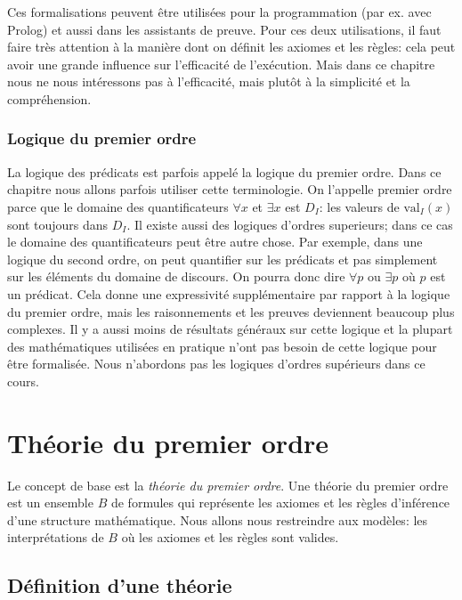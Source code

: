 {Ces formalisations peuvent être utilisées pour la programmation (par ex. avec Prolog)
et aussi dans les assistants de preuve.
Pour ces deux utilisations, il faut faire très attention à la manière dont on définit
les axiomes et les règles: cela peut avoir une grande influence sur l'efficacité de
l'exécution.
Mais dans ce chapitre nous ne nous intéressons pas à l'efficacité, mais plutôt à
la simplicité et la compréhension.

\subsubsection{Logique du premier ordre}

La logique des prédicats est parfois appelé la logique du premier ordre.
Dans ce chapitre nous allons parfois utiliser cette terminologie.
On l'appelle premier ordre parce que le domaine des quantificateurs $\forall x$ et $\exists x$
est $D_I$: les valeurs de $\mathrm{val}_I(x)$ sont toujours dans $D_I$.
Il existe aussi des logiques d'ordres superieurs; dans ce cas le domaine des quantificateurs
peut être autre chose.
Par exemple, dans une logique du second ordre, on peut quantifier sur les prédicats et pas
simplement sur les éléments du domaine de discours.
On pourra donc dire $\forall p$ ou $\exists p$ où $p$ est un prédicat.
Cela donne une expressivité supplémentaire par rapport à la logique du premier ordre,
mais les raisonnements et les preuves deviennent beaucoup plus complexes.
Il y a aussi moins de résultats généraux sur cette logique
et la plupart des mathématiques utilisées en pratique n'ont pas besoin de cette logique
pour être formalisée.
Nous n'abordons pas les logiques d'ordres supérieurs dans ce cours.

\section{Théorie du premier ordre}

Le concept de base est la {\em théorie du premier ordre}.
Une théorie du premier ordre est un ensemble $B$ de formules
qui représente les axiomes et les règles d'inférence d'une structure mathématique.
Nous allons nous restreindre aux modèles: les interprétations de $B$
où les axiomes et les règles sont valides.

\subsection{Définition d'une théorie}

}
